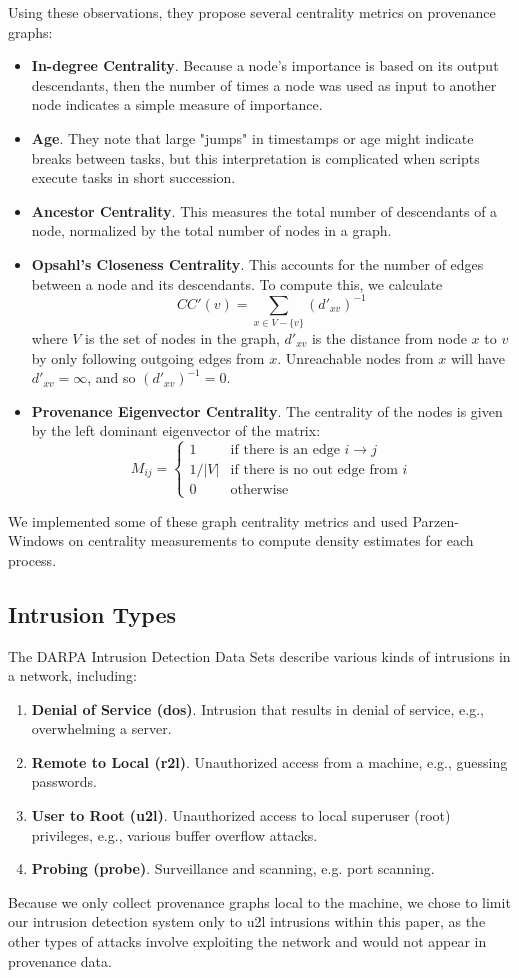 \documentclass[10pt,twocolumn]{article}
\begin{document}
Using these observations, they propose several centrality metrics on provenance graphs:
\begin{itemize}
\item \textbf{In-degree Centrality}. Because a node's importance is based on its output descendants, then the number of times a node was used as input to another node indicates a simple measure of importance.
\item \textbf{Age}. They note that large "jumps" in timestamps or age might indicate breaks between tasks, but this interpretation is complicated when scripts execute tasks in short succession.
\item \textbf{Ancestor Centrality}. This measures the total number of descendants of a node, normalized by the total number of nodes in a graph.
\item \textbf{Opsahl's Closeness Centrality}. This accounts for the number of edges between a node and its descendants. To compute this, we calculate
$$CC'(v) = \sum_{x \in V -  \{v\}} (d'_{xv})^{-1}$$
where $V$ is the set of nodes in the graph, $d'_{xv}$ is the distance from node $x$ to $v$ by only following outgoing edges from $x$. Unreachable nodes from $x$ will have $d'_{xv} = \infty$, and so $(d'_{xv})^{-1} = 0$.
\item \textbf{Provenance Eigenvector Centrality}. The centrality of the nodes is given by the left dominant eigenvector of the matrix:
$$M_{ij} =
\begin{cases}
1 & \text{if there is an edge } i \to j \\
1/|V| & \text{if there is no out edge from } i \\
0 & \text{otherwise}
\end{cases}
$$
\end{itemize}
We implemented some of these graph centrality metrics and used Parzen-Windows on centrality measurements to compute density estimates for each process.

\subsection{Intrusion Types}

The DARPA Intrusion Detection Data Sets \cite{darpa} describe various kinds of intrusions in a network, including:
\begin{enumerate}
\item {\bf Denial of Service (dos)}. Intrusion that results in denial of service, e.g., overwhelming a server.
\item {\bf Remote to Local (r2l)}. Unauthorized access from a machine, e.g., guessing passwords.
\item {\bf User to Root (u2l)}. Unauthorized access to local superuser (root) privileges, e.g., various buffer overflow attacks.
\item {\bf Probing (probe)}. Surveillance and scanning, e.g. port scanning.
\end{enumerate}
Because we only collect provenance graphs local to the machine, we chose to limit our intrusion detection system only to u2l intrusions within this paper, as the other types of attacks involve exploiting the network and would not appear in provenance data.
\end{document}
